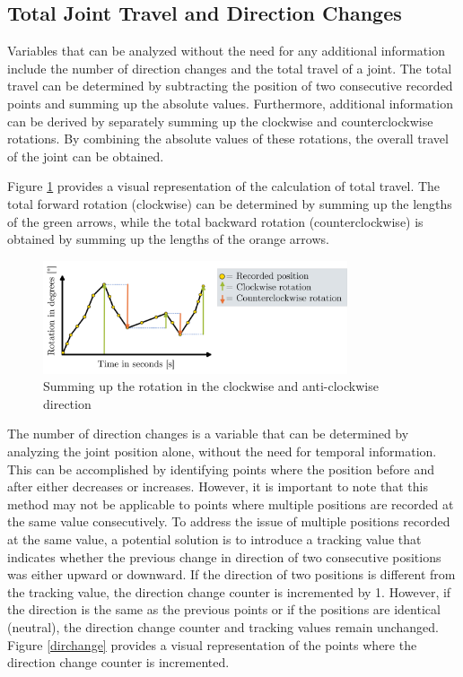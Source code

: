 \subsection{Total Joint Travel and Direction Changes}
Variables that can be analyzed without the need for any additional information include the number of direction changes and the total travel of a joint. The total travel can be determined by subtracting the position of two consecutive recorded points and summing up the absolute values. Furthermore, additional information can be derived by separately summing up the clockwise and counterclockwise rotations. By combining the absolute values of these rotations, the overall travel of the joint can be obtained.

Figure \ref{travel} provides a visual representation of the calculation of total travel. The total forward rotation (clockwise) can be determined by summing up the lengths of the green arrows, while the total backward rotation (counterclockwise) is obtained by summing up the lengths of the orange arrows.

\begin{figure}[H]
	\centerline{\includegraphics[width=0.8\textwidth]{figures/travel.png}}
	\caption{Summing up the rotation in the clockwise and anti-clockwise direction }
	\label{travel}
\end{figure}

The number of direction changes is a variable that can be determined by analyzing the joint position alone, without the need for temporal information. This can be accomplished by identifying points where the position before and after either decreases or increases. However, it is important to note that this method may not be applicable to points where multiple positions are recorded at the same value consecutively. To address the issue of multiple positions recorded at the same value, a potential solution is to introduce a tracking value that indicates whether the previous change in direction of two consecutive positions was either upward or downward. If the direction of two positions is different from the tracking value, the direction change counter is incremented by 1. However, if the direction is the same as the previous points or if the positions are identical (neutral), the direction change counter and tracking values remain unchanged. Figure \ref{dirchange} provides a visual representation of the points where the direction change counter is incremented.


